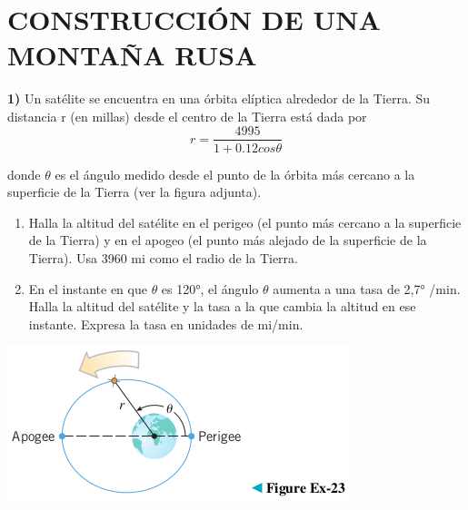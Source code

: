 \chapter*{CONSTRUCCIÓN DE UNA MONTAÑA RUSA}

\textbf{1)} Un satélite se encuentra en una órbita elíptica alrededor de la Tierra. Su distancia r (en millas) desde el centro de la Tierra está dada por$$r=\frac{4995}{1+0.12cos\theta}$$

donde $\theta$ es el ángulo medido desde el punto de la órbita más cercano a la superficie de la Tierra (ver la figura adjunta).
\begin{enumerate}[label=\alph*)]
	\item Halla la altitud del satélite en el perigeo (el punto más cercano a la superficie de la Tierra) y en el apogeo (el punto más alejado de la superficie de la Tierra). Usa 3960 mi como el radio de la Tierra.
	\item En el instante en que $\theta$ es 120°, el ángulo $\theta$ aumenta a una tasa de 2,7° /min. Halla la altitud del satélite y la tasa a la que cambia la altitud en ese instante. Expresa la tasa en unidades de mi/min.
\end{enumerate}
\begin{center}
	\includegraphics[height = 0.14\textheight]{recursos/image.png}\par
\end{center}


